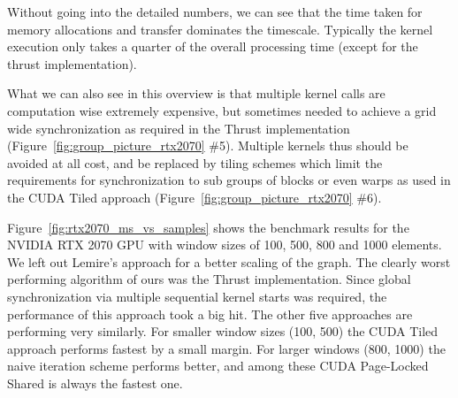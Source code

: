 Without going into the detailed numbers, we can see that the time taken for memory allocations and transfer dominates the timescale. Typically the kernel execution only takes a quarter of the overall processing time (except for the thrust implementation). 

What we can also see in this overview is that multiple kernel calls are computation wise extremely expensive, but sometimes needed to achieve a grid wide synchronization as required in the Thrust implementation (Figure~\ref{fig:group_picture_rtx2070} \#5). Multiple kernels thus should be avoided at all cost, and be replaced by tiling schemes which limit the requirements for synchronization to sub groups of blocks or even warps as used in the CUDA Tiled approach (Figure~\ref{fig:group_picture_rtx2070} \#6). 

Figure~\ref{fig:rtx2070_ms_vs_samples} shows the benchmark results for the NVIDIA RTX 2070 GPU with window sizes of 100, 500, 800 and 1000 elements. We left out Lemire's approach for a better scaling of the graph. The clearly worst performing algorithm of ours was the Thrust implementation. Since global synchronization via multiple sequential kernel starts was required, the performance of this approach took a big hit. The other five approaches are performing very similarly. For smaller window sizes (100, 500) the CUDA Tiled approach performs fastest by a small margin. For larger windows (800, 1000) the naive iteration scheme performs better, and among these CUDA Page-Locked Shared is always the fastest one.

